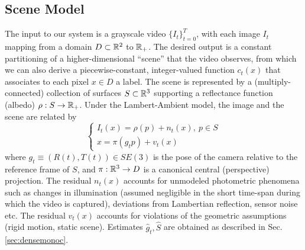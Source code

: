 \subsection{Scene Model}\label{sec:sceneModel}

The input to our system is a grayscale video $\{I_t\}_{t = 0}^T$, with each image
$I_t$ mapping from a domain $D\subset\mathbb{R}^2$ to $\mathbb{R}_+$. 
The desired output is a constant partitioning of a
higher-dimensional ``scene'' that the video observes, from which we can also derive a piecewise-constant,
integer-valued function 
{$c_t(x)$} that associates to each pixel $x\in D$ a label. The scene is
represented
by a (multiply-connected) collection of surfaces $S \subset \mathbb{R}^3$ supporting a reflectance
function (albedo) $\rho : S \rightarrow \mathbb{R}_+$. 
Under the Lambert-Ambient model, the image and the scene are related by
\begin{equation}
\begin{cases} I_t(x) = \rho(p) + n_t(x), \ p \in S \\ x = \pi(g_t p) + v_t(x)
\end{cases}
\end{equation}
where $g_t \equiv (R(t), T(t)) \in SE(3)$ is the pose of the camera relative to
the reference frame of $S$, and $\pi:\mathbb{R}^3 \rightarrow D$ is a canonical
central (perspective) projection. The residual $n_t(x)$ accounts for unmodeled
photometric phenomena such as changes in illumination (assumed negligible in the
short time-span during which the video is captured), deviations from Lambertian
reflection, sensor noise etc. The residual $v_t(x)$ accounts for violations of
the geometric assumptions (rigid motion, static scene). Estimates $\hat g_t, \hat S$ are
obtained as described in Sec. \ref{sec:densemonoc}.

